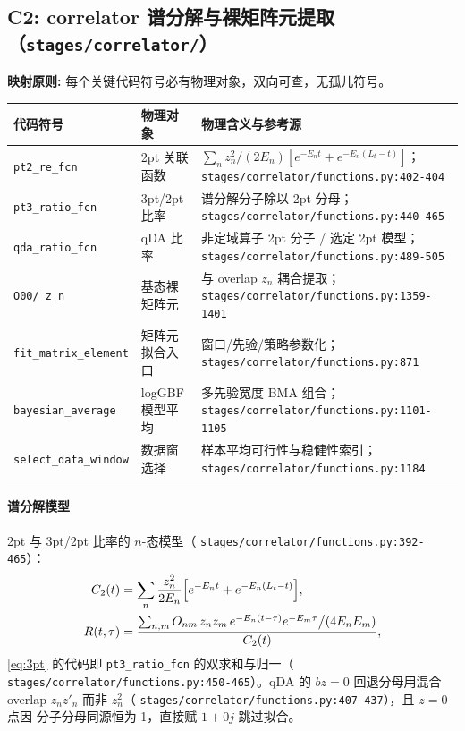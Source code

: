 \documentclass[UTF8]{ctexart}
\begin{document}
\subsection{C2: correlator 谱分解与裸矩阵元提取（\texttt{stages/correlator/}）}

\begin{mapbox}
\textbf{映射原则:} 每个关键代码符号必有物理对象，双向可查，无孤儿符号。
\end{mapbox}
\begin{xltabular}{\textwidth}{llX}
\toprule
\textcolor{map}{代码符号} & 物理对象 & 物理含义与参考源 \\
\midrule
\endhead
\texttt{pt2\_re\_fcn} & 2pt 关联函数 & $\sum_n z_n^2/(2E_n)[e^{-E_n t}+e^{-E_n(L_t-t)}]$；\texttt{\nolinkurl{stages/correlator/functions.py:402-404}} \\
\texttt{pt3\_ratio\_fcn} & 3pt/2pt 比率 & 谱分解分子除以 2pt 分母；\texttt{\nolinkurl{stages/correlator/functions.py:440-465}} \\
\texttt{qda\_ratio\_fcn} & qDA 比率 & 非定域算子 2pt 分子 / 选定 2pt 模型；\texttt{\nolinkurl{stages/correlator/functions.py:489-505}} \\
\texttt{O00/ z\_n} & 基态裸矩阵元 & 与 overlap $z_n$ 耦合提取；\texttt{\nolinkurl{stages/correlator/functions.py:1359-1401}} \\
\texttt{fit\_matrix\_element} & 矩阵元拟合入口 & 窗口/先验/策略参数化；\texttt{\nolinkurl{stages/correlator/functions.py:871}} \\
\texttt{bayesian\_average} & logGBF 模型平均 & 多先验宽度 BMA 组合；\texttt{\nolinkurl{stages/correlator/functions.py:1101-1105}} \\
\texttt{select\_data\_window} & 数据窗选择 & 样本平均可行性与稳健性索引；\texttt{\nolinkurl{stages/correlator/functions.py:1184}} \\
\bottomrule
\end{xltabular}

\paragraph{谱分解模型} 2pt 与 3pt/2pt 比率的 $n$-态模型（
\texttt{\nolinkurl{stages/correlator/functions.py:392-465}}）：
\begin{align}
C_{2}(t)&=\sum_{n}\frac{z_n^2}{2E_n}\Bigl[e^{-E_n t}+e^{-E_n(L_t-t)}\Bigr], \label{eq:2pt}\\
R(t,\tau)&=\frac{\sum_{n,m}O_{nm}\,z_n z_m\,e^{-E_n(t-\tau)}e^{-E_m\tau}
\big/(4E_nE_m)}{C_2(t)}, \label{eq:3pt}
\end{align}
\eqref{eq:3pt} 的代码即 \texttt{pt3\_ratio\_fcn} 的双求和与归一（
\texttt{\nolinkurl{stages/correlator/functions.py:450-465}}）。qDA 的
$bz=0$ 回退分母用混合 overlap $z_n z'_n$ 而非 $z_n^2$（
\texttt{\nolinkurl{stages/correlator/functions.py:407-437}}），且 $z=0$ 点因
分子分母同源恒为 1，直接赋 $1+0j$ 跳过拟合。
\end{document}
